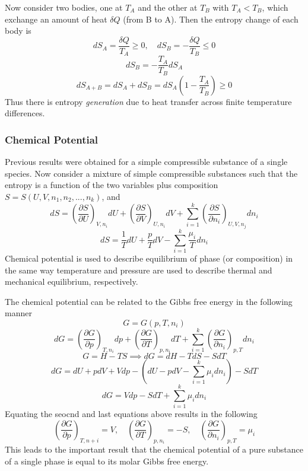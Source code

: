 \documentclass[12pt]{article}
\newcommand{\sumlim}[2]{\sum\limits_{#1}^{#2}}
\newcommand{\Partial}[2]{\frac{\partial #1}{\partial #2}}
\newcommand{\PartialConst}[3]{\left(\Partial{#1}{#2}\right)_{#3}}
\begin{document}
Now consider two bodies, one at $T_A$ and the other at $T_B$ with $T_A<T_B$, which exchange an amount of heat $\delta Q$ (from B to A). Then the entropy change of each body is
$$dS_A =  \frac{\delta Q}{T_A}\geq0,\quad dS_B = - \frac{\delta Q}{T_B}\leq0$$
$$dS_B = -\frac{T_A}{T_B}dS_A$$
$$dS_{A+B} = dS_A + dS_B = dS_A\left(1-\frac{T_A}{T_B}\right)\geq0$$
Thus there is entropy \emph{generation} due to heat transfer across finite temperature differences.

\subsubsection{Chemical Potential}
Previous results were obtained for a simple compressible substance of a single species. Now consider a mixture of simple compressible substances such that the entropy is a function of the two variables plus composition $S = S(U,V,n_1,n_2,...,n_k)$, and
$$dS = \PartialConst{S}{U}{V,n_i}dU + \PartialConst{S}{V}{U,n_i}dV + \sumlim{i=1}{k}\PartialConst{S}{n_i}{U,V,n_j}dn_i$$
$$dS = \frac{1}{T}dU + \frac{p}{T}dV - \sumlim{i=1}{k}\frac{\mu_i}{T}dn_i$$
Chemical potential is used to describe equilibrium of phase (or composition) in the same way temperature and pressure are used to describe thermal and mechanical equilibrium, respectively.

The chemical potential can be related to the Gibbs free energy in the following manner
$$G = G(p,T,n_i)$$
$$dG = \PartialConst{G}{p}{T,n_i}dp + \PartialConst{G}{T}{p,n_i}dT + \sumlim{i=1}{k}\PartialConst{G}{n_i}{p,T}dn_i$$
$$G = H - TS \implies dG = dH - TdS - SdT $$
$$dG = dU + pdV + Vdp - \left(dU - pdV -\sumlim{i=1}{k}\mu_idn_i\right) - SdT$$
$$dG = Vdp - SdT + \sumlim{i=1}{k}\mu_idn_i$$
Equating the seocnd and last equations above results in the following
$$\PartialConst{G}{p}{T,n+i}=V,\quad\PartialConst{G}{T}{p,n_i}=-S,\quad\PartialConst{G}{n_i}{p,T}=\mu_i$$
This leads to the important result that the chemical potential of a pure substance of a single phase is equal to its molar Gibbs free energy.
\end{document}
